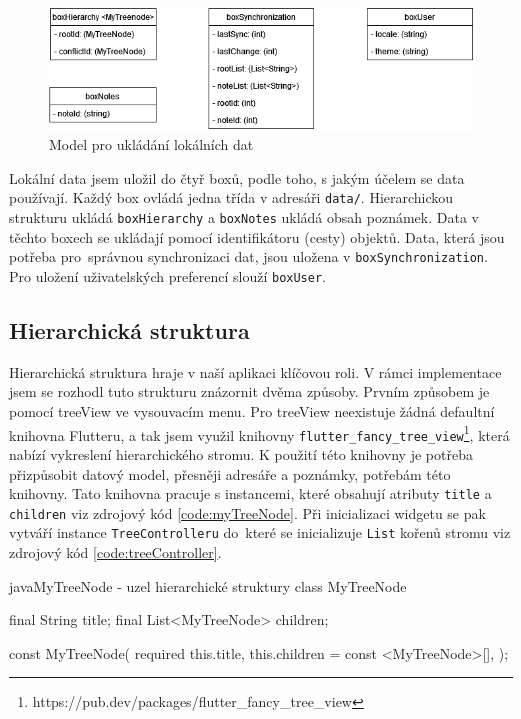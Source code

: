 \documentclass[czech, bc, kiv, he, iso690numb]{fasthesis}
\begin{document}
\begin{figure}[h]
  \centering
  \includegraphics[width=1\textwidth]{img/BP-Runt/Planning/local-data-model.png}
  \caption{Model pro ukládání lokálních dat}
  \label{fig:local-data-model}
\end{figure}

Lokální data jsem uložil do čtyř boxů, podle toho, s jakým účelem se data používají. Každý box ovládá jedna třída v adresáři \texttt{data/}. Hierarchickou strukturu ukládá \texttt{boxHierarchy} a \texttt{boxNotes} ukládá obsah poznámek. Data v těchto boxech se ukládají pomocí identifikátoru (cesty) objektů. Data, která jsou potřeba pro~správnou synchronizaci dat, jsou uložena v \texttt{boxSynchronization}. Pro uložení uživatelských preferencí slouží \texttt{boxUser}.

\subsection{Hierarchická struktura}

Hierarchická struktura hraje v naší aplikaci klíčovou roli. V rámci implementace jsem se rozhodl tuto strukturu znázornit dvěma způsoby. Prvním způsobem je pomocí treeView ve vysouvacím menu. Pro treeView neexistuje žádná defaultní knihovna Flutteru, a tak jsem využil knihovny \texttt{flutter\_fancy\_tree\_view}\footnote{https://pub.dev/packages/flutter\_fancy\_tree\_view}, která nabízí vykreslení hierarchického stromu. K použití této knihovny je potřeba přizpůsobit datový model, přesněji adresáře a poznámky, potřebám této knihovny. Tato knihovna pracuje s instancemi, které obsahují atributy \texttt{title} a \texttt{children} viz zdrojový kód \ref{code:myTreeNode}. Při inicializaci widgetu se pak vytváří instance \texttt{TreeControlleru} do~které se inicializuje \texttt{List} kořenů stromu viz zdrojový kód \ref{code:treeController}. 

\newpage

\begin{code}{java}{MyTreeNode - uzel hierarchické struktury \label{code:myTreeNode}}
class MyTreeNode {
    final String title;
    final List<MyTreeNode> children;

    const MyTreeNode({
        required this.title,
        this.children = const <MyTreeNode>[],
    });
}
\end{code}
\end{document}
